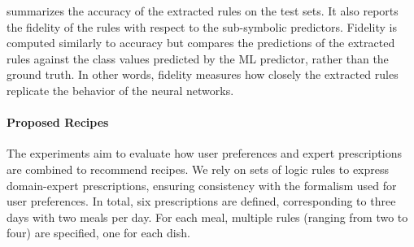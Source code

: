  summarizes the accuracy of the extracted rules on the test sets.
%
It also reports the fidelity of the rules with respect to the sub-symbolic predictors.
%
Fidelity is computed similarly to accuracy but compares the predictions of the extracted rules against the class values predicted by the \gls{ML} predictor, rather than the ground truth.
%
In other words, fidelity measures how closely the extracted rules replicate the behavior of the neural networks.


\paragraph{Proposed Recipes}\label{par:proposed-recipes}
%

%

%
The experiments aim to evaluate how user preferences and expert prescriptions are combined to recommend recipes.
%
We rely on sets of logic rules to express domain-expert prescriptions, ensuring consistency with the formalism used for user preferences.
%
In total, six prescriptions are defined, corresponding to three days with two meals per day.
%
For each meal, multiple rules (ranging from two to four) are specified, one for each dish.

